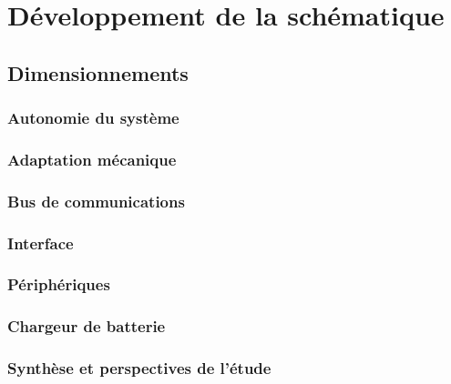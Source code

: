 \section{Développement de la schématique} \label{sec:Dev-Schematique}

\subsection{Dimensionnements} \label{ssec:Dev-Dimensionnements}

\subsubsection{Autonomie du système} \label{sssec:Autonomie-Systeme}

\subsubsection{Adaptation mécanique} \label{sssec:Adaptation-mech}

\subsubsection{Bus de communications} \label{sssec:Dev-BusComm}

\subsubsection{Interface} \label{sssec:Interface}

\subsubsection{Périphériques} \label{sssec:Peripheriques}

\subsubsection{Chargeur de batterie} \label{sssec:Chargeur-bat}

\subsubsection{Synthèse et perspectives de l'étude} \label{sssec:Synth-etude}